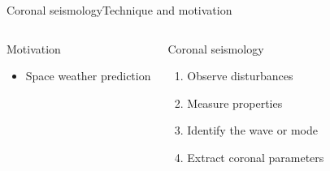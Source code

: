 \documentclass[11pt,table]{beamer}
\begin{document}
\begin{frame}{Coronal seismology}{Technique and motivation}
\begin{columns}
\begin{block}{Motivation}
\begin{itemize}
                \item Space weather prediction
            \end{itemize}
        \end{block}
        \begin{block}{Coronal seismology}
            \begin{enumerate}
                \item Observe disturbances
                \item Measure properties
                \item Identify the wave or mode
                \item Extract coronal parameters
            \end{enumerate}
        \end{block}
    \end{columns}
\end{frame}%
\end{document}
